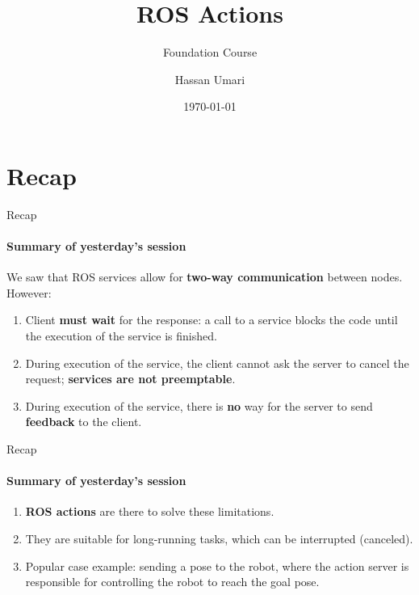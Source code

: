 \documentclass{beamer}
\author[MAS]{Hassan Umari}
\title{ROS Actions}
\subtitle{Foundation Course}
\institute[HBRS]{Hochschule Bonn-Rhein-Sieg}
\date{\today}
\begin{document}
{
\begin{frame}
\titlepage
\end{frame}
}


\section{Recap}
\begin{frame}{Recap}
    \framesubtitle{Summary of yesterday’s session}
    We saw that ROS services allow for \textbf{two-way communication} between nodes. However:
    \vspace{5mm}
    \begin{enumerate}
        
        \item Client \textbf{must wait} for the response: a call to a service blocks the code until the execution of the service is finished.
        \vspace{2mm}
        \item During execution of the service, the client cannot ask the server to cancel the request; \textbf{services are not preemptable}.

        \vspace{2mm}
        \item During execution of the service, there is \textbf{no} way for the server to send \textbf{feedback} to the client.


    \end{enumerate}
\end{frame}


\begin{frame}{Recap}
    \framesubtitle{Summary of yesterday’s session}
    

    \begin{enumerate}
        
        \item \textbf{ROS actions} are there to solve these limitations.
        
        \item They are suitable for long-running tasks, which can be interrupted (canceled).
        
        \item Popular case example: sending a pose to the robot, where the action server is responsible for controlling the robot to reach the goal pose.
        
        
    \end{enumerate}
\end{frame}
\end{document}
